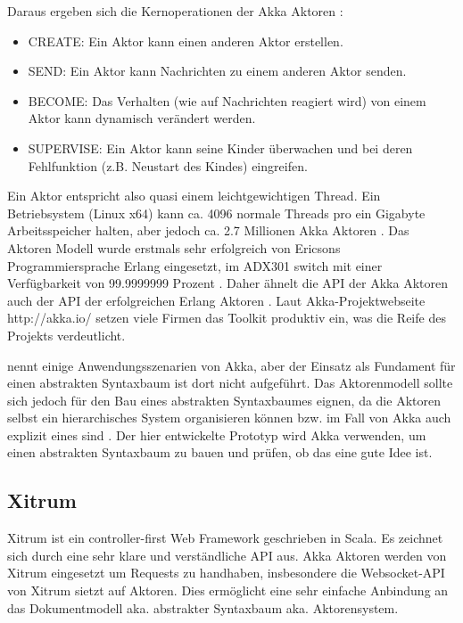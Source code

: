 Daraus ergeben sich die Kernoperationen der Akka Aktoren \citep[S.~23]{Roestenburg}:

 
\begin{itemize}

\item CREATE: Ein Aktor kann einen anderen Aktor erstellen.
\item SEND: Ein Aktor kann Nachrichten zu einem anderen Aktor senden.
\item BECOME: Das Verhalten (wie auf Nachrichten reagiert wird) von einem Aktor kann dynamisch verändert werden.
\item SUPERVISE: Ein Aktor kann seine Kinder überwachen und bei deren Fehlfunktion (z.B. Neustart des Kindes) eingreifen.
\end{itemize}
 
Ein Aktor entspricht also quasi einem leichtgewichtigen Thread. Ein Betriebsystem (Linux x64) kann ca. 4096 normale Threads pro ein Gigabyte Arbeitsspeicher halten, aber jedoch ca. 2.7 Millionen Akka Aktoren \citep[S.~20]{Roestenburg}. Das Aktoren Modell wurde erstmals sehr erfolgreich von Ericsons Programmiersprache Erlang eingesetzt, im ADX301 switch mit einer Verfügbarkeit von 99.9999999 Prozent \citep[S.~12]{Roestenburg}. Daher ähnelt die API der Akka Aktoren auch der API der erfolgreichen Erlang Aktoren \citep[S.~69]{Typesave}. Laut Akka-Projektwebseite http://akka.io/ setzen viele Firmen das Toolkit produktiv ein, was die Reife des Projekts verdeutlicht.

 
\citep[S.~7]{Typesave} nennt einige Anwendungsszenarien von Akka, aber der Einsatz als Fundament für einen abstrakten Syntaxbaum ist dort nicht aufgeführt. Das Aktorenmodell sollte sich jedoch für den Bau eines abstrakten Syntaxbaumes eignen, da die Aktoren selbst ein hierarchisches System organisieren können bzw. im Fall von Akka auch explizit eines sind \citep[S.~22]{Roestenburg}. Der hier entwickelte Prototyp wird Akka verwenden, um einen abstrakten Syntaxbaum zu bauen und prüfen, ob das eine gute Idee ist.

 
\subsection{Xitrum}\label{}
 
Xitrum ist ein controller-first Web Framework geschrieben in Scala. Es zeichnet sich durch eine sehr klare und verständliche API aus. Akka Aktoren werden von Xitrum eingesetzt um Requests zu handhaben, insbesondere die Websocket-API von Xitrum sietzt auf Aktoren. Dies ermöglicht eine sehr einfache Anbindung an das Dokumentmodell aka. abstrakter Syntaxbaum aka. Aktorensystem.

